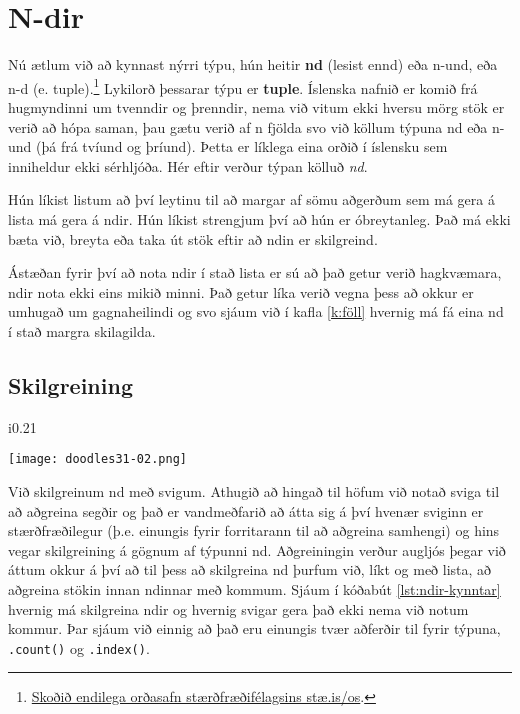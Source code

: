 
\chapter{N-dir}\label{k:ndir}
Nú ætlum við að kynnast nýrri týpu, hún heitir \textbf{nd} (lesist ennd) eða n-und, eða n-d (e. tuple).\footnote{\href{http://stae.is/os}{Skoðið endilega orðasafn stærðfræðifélagsins stæ.is/os}.}
Lykilorð þessarar týpu er \textbf{tuple}.
Íslenska nafnið er komið frá hugmyndinni um tvenndir og þrenndir, nema við vitum ekki hversu mörg stök er verið að hópa saman, þau gætu verið af n fjölda svo við köllum týpuna nd eða n-und (þá frá tvíund og þríund).
Þetta er líklega eina orðið í íslensku sem inniheldur ekki sérhljóða.
Hér eftir verður týpan kölluð \emph{nd}.

Hún líkist listum að því leytinu til að margar af sömu aðgerðum sem má gera á lista má gera á ndir.
Hún líkist strengjum því að hún er óbreytanleg.
Það má ekki bæta við, breyta eða taka út stök eftir að ndin er skilgreind.

Ástæðan fyrir því að nota ndir í stað lista er sú að það getur verið hagkvæmara, ndir nota ekki eins mikið minni.
Það getur líka verið vegna þess að okkur er umhugað um gagnaheilindi og svo sjáum við í kafla \ref{k:föll} hvernig má fá eina nd í stað margra skilagilda.

\section{Skilgreining}
 \begin{wrapfigure}{i}{0.21\textwidth} %
	\begin{center}
		\texttt{[image: doodles31-02.png]}
	\end{center}
\end{wrapfigure}
Við skilgreinum nd með svigum.
Athugið að hingað til höfum við notað sviga til að aðgreina segðir og það er vandmeðfarið að átta sig á því hvenær sviginn er stærðfræðilegur (þ.e. einungis fyrir forritarann til að aðgreina samhengi) og hins vegar skilgreining á gögnum af týpunni nd.
Aðgreiningin verður augljós þegar við áttum okkur á því að til þess að skilgreina nd þurfum við, líkt og með lista, að aðgreina stökin innan ndinnar með kommum.
Sjáum í kóðabút \ref{lst:ndir-kynntar} hvernig má skilgreina ndir og hvernig svigar gera það ekki nema við notum kommur.
Þar sjáum við einnig að það eru einungis tvær aðferðir til fyrir týpuna, \texttt{.count()} og \texttt{.index()}.

